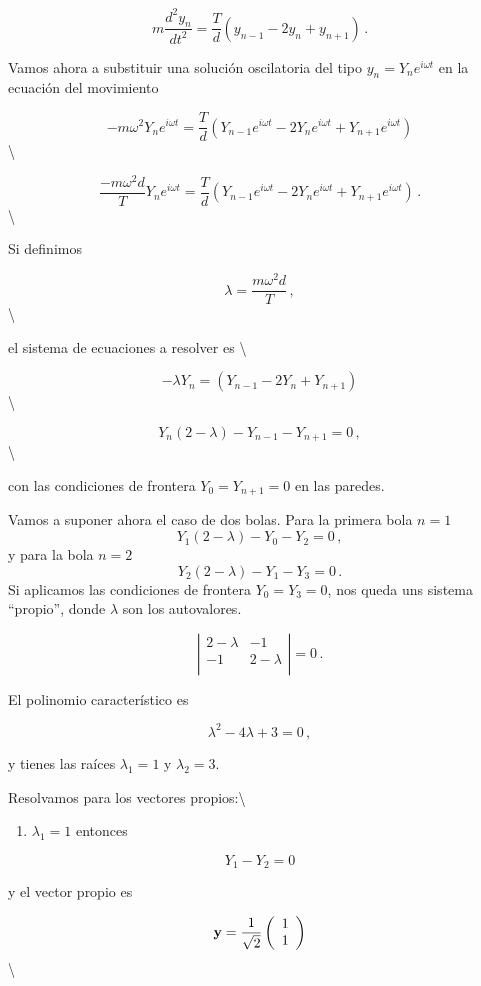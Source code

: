 \documentclass[
]{agujournal2019}
\providecommand{\tightlist}{%
  \setlength{\itemsep}{0pt}\setlength{\parskip}{0pt}}\usepackage{longtable,booktabs,array}
\begin{document}
\[m\frac{d^2y_n}{dt^2}=\frac{T}{d}(y_{n-1}-2y_n+y_{n+1})\,.\]

Vamos ahora a substituir una solución oscilatoria del tipo
\(y_n=Y_n e^{i\omega t}\) en la ecuación del movimiento

\[-m\omega^2 Y_n e^{i\omega t}=\frac{T}{d}(Y_{n-1} e^{i\omega t}-2Y_n e^{i\omega t}+Y_{n+1} e^{i\omega t})\]
\textbackslash{}

\[\frac{-m\omega^2 d}{T} Y_n e^{i\omega t}=\frac{T}{d}(Y_{n-1} e^{i\omega t}-2Y_n e^{i\omega t}+Y_{n+1} e^{i\omega t})\,.\]
\textbackslash{}

Si definimos

\[\lambda=\frac{m\omega^2 d}{T}\,,\] \textbackslash{}

el sistema de ecuaciones a resolver es \textbackslash{}

\[-\lambda Y_n=(Y_{n-1}-2Y_n +Y_{n+1})\] \textbackslash{}

\[Y_n(2-\lambda)-Y_{n-1}-Y_{n+1}=0\,,\] \textbackslash{}

con las condiciones de frontera \(Y_0=Y_{n+1}=0\) en las paredes.

Vamos a suponer ahora el caso de dos bolas. Para la primera bola \(n=1\)
\[Y_1(2-\lambda)-Y_0-Y_2=0\,,\] y para la bola \(n=2\)
\[Y_2(2-\lambda)-Y_1-Y_3=0\,.\] Si aplicamos las condiciones de frontera
\(Y_0=Y_3=0\), nos queda uns sistema ``propio'', donde \(\lambda\) son
los autovalores.

\[\left|\begin{array}{cc}
  2-\lambda & -1 \\
   -1 & 2-\lambda\\
        \end{array}\right|=0\,.\]

El polinomio característico es

\[\lambda^2-4\lambda+3=0\,,\]

y tienes las raíces \(\lambda_1=1\) y \(\lambda_2=3\).

Resolvamos para los vectores propios:\textbackslash{}

\begin{enumerate}
\def\labelenumi{(\arabic{enumi})}
\tightlist
\item
  \(\lambda_1=1\) entonces
\end{enumerate}

\[Y_1-Y_2=0\]

y el vector propio es

\[{\textbf y}=\frac{1}{\sqrt{2}}\left(\begin{array}{c}
   1 \\
   1 \\
        \end{array}\right)\] \textbackslash{}
\end{document}
